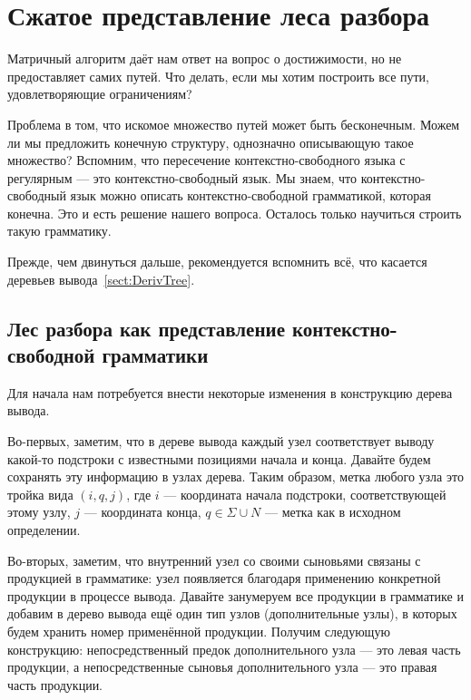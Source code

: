 \chapter{Сжатое представление леса разбора}

Матричный алгоритм даёт нам ответ на вопрос о достижимости, но не предоставляет самих путей.
Что делать, если мы хотим построить все пути, удовлетворяющие ограничениям?

Проблема в том, что искомое множество путей может быть бесконечным.
Можем ли мы предложить конечную структуру, однозначно описывающую такое множество?
Вспомним, что пересечение контекстно-свободного языка с регулярным --- это контекстно-свободный язык.
Мы знаем, что контекстно-свободный язык можно описать контекстно-свободной грамматикой, которая конечна.
Это и есть решение нашего вопроса.
Осталось только научиться строить такую грамматику.

Прежде, чем двинуться дальше, рекомендуется вспомнить всё, что касается деревьев вывода~\ref{sect:DerivTree}.

\section{Лес разбора как представление контекстно-свободной грамматики}

Для начала нам потребуется внести некоторые изменения в конструкцию дерева вывода.

Во-первых, заметим, что в дереве вывода каждый узел соответствует выводу какой-то подстроки с известными позициями начала и конца.
Давайте будем сохранять эту информацию в узлах дерева.
Таким образом, метка любого узла это тройка вида $(i,q,j)$, где $i$ --- координата начала подстроки, соответствующей этому узлу, $j$ --- координата конца, $q \in \Sigma \cup N$ --- метка как в исходном определении.

Во-вторых, заметим, что внутренний узел со своими сыновьями связаны с продукцией в грамматике: узел появляется благодаря применению конкретной продукции в процессе вывода.
Давайте занумеруем все продукции в грамматике и добавим в дерево вывода ещё один тип узлов (дополнительные узлы), в которых будем хранить номер применённой продукции.
Получим следующую конструкцию: непосредственный предок дополнительного узла --- это левая часть продукции, а непосредственные сыновья дополнительного узла --- это правая часть продукции.

